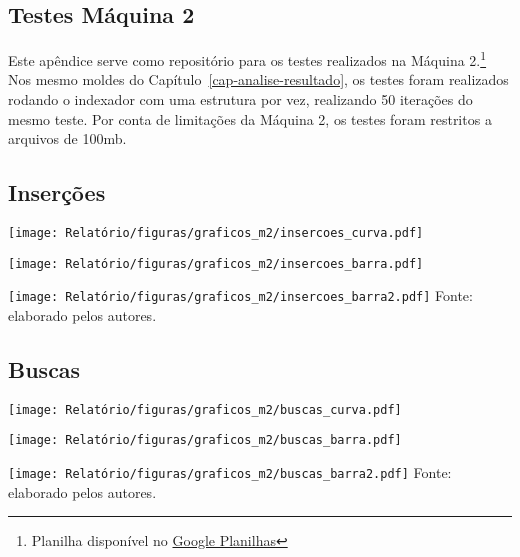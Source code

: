 \begin{apendicesenv}

\chapter{Testes Máquina 2}\label{apendiceA}

Este apêndice serve como repositório para os testes realizados na Máquina 2.\footnote{Planilha disponível no \href{https://docs.google.com/spreadsheets/d/1yzVdhAuRN6BSb2E2VDG79fv59cQ-DlLtYV5bvRnVaVQ/edit?usp=sharing}{Google Planilhas}} Nos mesmo moldes do Capítulo~\ref{cap-analise-resultado}, os testes foram realizados rodando o indexador com uma estrutura por vez, realizando 50 iterações do mesmo teste. Por conta de limitações da Máquina 2, os testes foram restritos a arquivos de 100mb.


\section{Inserções}

\begin{center}\label{graf_ins_curva_m2}
    \texttt{[image: Relatório/figuras/graficos\_m2/insercoes\_curva.pdf]}
\end{center}

\begin{center}\label{graf_ins_barra_m2}
    \texttt{[image: Relatório/figuras/graficos\_m2/insercoes\_barra.pdf]}
\end{center}

\begin{center}\label{graf_ins_barra2_m2}
    \texttt{[image: Relatório/figuras/graficos\_m2/insercoes\_barra2.pdf]}
    \small{Fonte: elaborado pelos autores.}
\end{center}


\section{Buscas}

\begin{center}\label{graf_buscas_curva_m2}
    \texttt{[image: Relatório/figuras/graficos\_m2/buscas\_curva.pdf]}
\end{center}

\begin{center}\label{graf_buscas_barra_m2}
    \texttt{[image: Relatório/figuras/graficos\_m2/buscas\_barra.pdf]}
\end{center}

\begin{center}\label{graf_buscas_barra2_m2}
    \texttt{[image: Relatório/figuras/graficos\_m2/buscas\_barra2.pdf]}
    \small{Fonte: elaborado pelos autores.}
\end{center}

\end{apendicesenv}